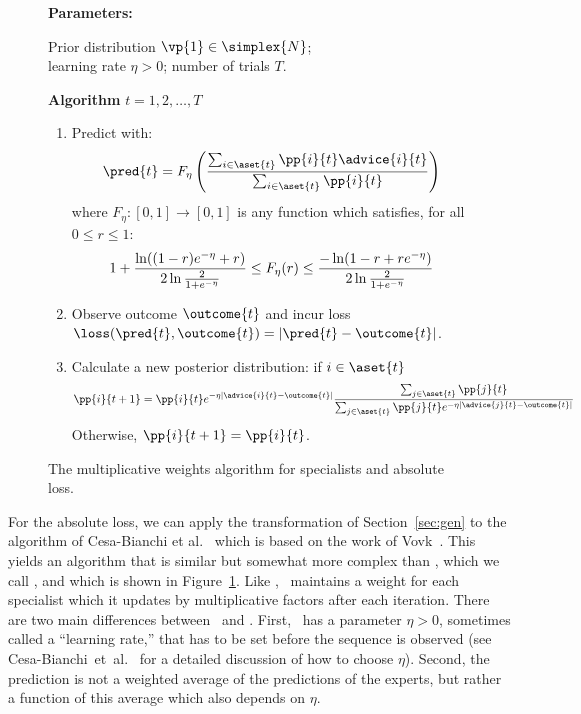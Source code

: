 \begin{figure}[t]
\normalsize
{\bf Parameters:}
\begin{minipage}[t]{\parmwidth}
Prior distribution $\vp{1}\in \simplex{N}$; \\
learning rate $\eta>0$;
number of trials $T$.
\end{minipage} \newline

{\bf Algorithm \SAbs} \newline
{} $t=1,2,\ldots,T$
\begin{enumerate}
 \item Predict with:
  $$
	\pred{t} = F_{\eta} \left(
                   { \sum_{i \in \aset{t}} \pp{i}{t} \advice{i}{t} 
                     \over 
                     \sum_{i \in \aset{t}} \pp{i}{t} }
                   \right)
  $$
  where $F_{\eta}:[0,1] \to [0,1]$ is any function which satisfies,
for all $0 \leq r \leq 1$:
\[
1+{ \ln((1-r)e^{-\eta}+r) \over 2 \ln {2 \over 1+e^{-\eta}}}
\leq F_{\eta}(r) \leq
{-\ln(1-r+r e^{-\eta}) \over 2 \ln {2 \over 1+e^{-\eta}} }
\]
 \item Observe outcome $\outcome{t}$ and 
       incur loss $\loss(\pred{t},\outcome{t})=|\pred{t} - \outcome{t}|$.
 \item Calculate a new posterior distribution:
if $i \in \aset{t}$
\[
	\pp{i}{t+1} = \pp{i}{t} e^{-\eta |\advice{i}{t} - \outcome{t}|}
	{\sum_{j \in \aset{t}}
          \pp{j}{t}
         \over
         \sum_{j \in \aset{t}}
          \pp{j}{t} e^{-\eta |\advice{j}{t} - \outcome{t}|}
        }
\]
Otherwise, $\pp{i}{t+1} =\pp{i}{t}$.
\end{enumerate}

\figline
\caption{The multiplicative weights algorithm for specialists and 
absolute loss.\label{fig:SAbs}}
\end{figure}


For the absolute loss, we can apply the transformation of
Section~\ref{sec:gen} to the algorithm of Cesa-Bianchi et
al.~\cite{CesabianchiFrHeHaScWa92} which is based on the work of 
Vovk~\cite{Vovk90}.
This yields an algorithm that is
similar but somewhat more complex than \SBayes, which we call \SAbs,
and which is shown in Figure~\ref{fig:SAbs}.
Like \SBayes, \SAbs\ maintains a weight for each specialist 
which it updates by multiplicative factors after each iteration. 
There are two main differences between \SAbs\ and \SBayes.
First, \SAbs\ has a parameter $\eta>0$, sometimes called a ``learning
rate,'' that has to be set
before the sequence is observed (see
Cesa-Bianchi~et~al.~\cite{CesabianchiFrHeHaScWa92} for a detailed
discussion of how to choose $\eta$).
Second, the prediction is not a weighted average of the
predictions of the experts, but rather a function of this average
which also depends on $\eta$.

